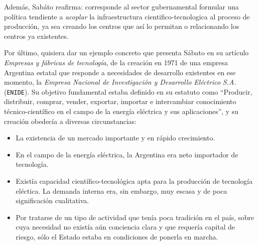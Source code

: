 Además, Sabáto reafirma: corresponde al sector gubernamental formular una política tendiente a \textit{acoplar} la infraestructura cientifico-tecnologica al proceso de producción, ya sea creando los centros que así lo permitan o relacionando los centros ya existentes.

\vspace{0.5em}

Por último, quisiera dar un ejemplo concreto que presenta Sábato en su artículo \textit{Empresas y fábricas de tecnología}, de la creación en 1971 de una empresa Argentina estatal que responde a necesidades de desarrollo existentes en ese momento, la \textit{Empresa Nacional de Investigación y Desarrollo Eléctrico S.A.} (\texttt{ENIDE}). Su objetivo fundamental estaba definido en su estatuto como ``Producir, distribuir, comprar, vender, exportar, importar e intercambiar conocimiento técnico-científico en el campo de la energía eléctrica y sus aplicaciones'', y su creación obedecía a diversas circunstancias:

\begin{itemize}
    \item La existencia de un mercado importante y en rápido crecimiento.
    \item En el campo de la energía eléctrica, la Argentina era neto importador de tecnología.
    \item Existía capacidad científico-tecnológica apta para la producción de tecnología eléctica. La demanda interna era, sin embargo, muy escasa y de poca significación cualitativa.
    \item Por tratarse de un tipo de actividad que tenía poca tradición en el país, sobre cuya necesidad no existía aún conciencia clara y que requería capital de riesgo, sólo el Estado estaba en condiciones de ponerla en marcha.
\end{itemize}

